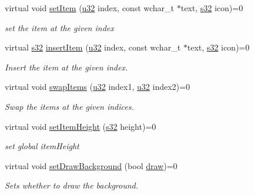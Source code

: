 \begin{DoxyCompactItemize}
\mbox{\label{classirr_1_1gui_1_1IGUIListBox_a643ca28110a7de59a378e5ba79b1c37a}} 
virtual void \hyperlink{classirr_1_1gui_1_1IGUIListBox_a643ca28110a7de59a378e5ba79b1c37a}{set\+Item} (\hyperlink{namespaceirr_a0416a53257075833e7002efd0a18e804}{u32} index, const wchar\+\_\+t $\ast$text, \hyperlink{namespaceirr_ac66849b7a6ed16e30ebede579f9b47c6}{s32} icon)=0
\begin{DoxyCompactList}\small\item\em set the item at the given index \end{DoxyCompactList}\item 
virtual \hyperlink{namespaceirr_ac66849b7a6ed16e30ebede579f9b47c6}{s32} \hyperlink{classirr_1_1gui_1_1IGUIListBox_a1da5cc33687efee5ff1e33ab9f0d5b26}{insert\+Item} (\hyperlink{namespaceirr_a0416a53257075833e7002efd0a18e804}{u32} index, const wchar\+\_\+t $\ast$text, \hyperlink{namespaceirr_ac66849b7a6ed16e30ebede579f9b47c6}{s32} icon)=0
\begin{DoxyCompactList}\small\item\em Insert the item at the given index. \end{DoxyCompactList}\item 
\mbox{\label{classirr_1_1gui_1_1IGUIListBox_accb47d6f72558ea5d3034b3e4e4ccd81}} 
virtual void \hyperlink{classirr_1_1gui_1_1IGUIListBox_accb47d6f72558ea5d3034b3e4e4ccd81}{swap\+Items} (\hyperlink{namespaceirr_a0416a53257075833e7002efd0a18e804}{u32} index1, \hyperlink{namespaceirr_a0416a53257075833e7002efd0a18e804}{u32} index2)=0
\begin{DoxyCompactList}\small\item\em Swap the items at the given indices. \end{DoxyCompactList}\item 
\mbox{\label{classirr_1_1gui_1_1IGUIListBox_a83fb9c6f32039a39197cf799dd5e0c8f}} 
virtual void \hyperlink{classirr_1_1gui_1_1IGUIListBox_a83fb9c6f32039a39197cf799dd5e0c8f}{set\+Item\+Height} (\hyperlink{namespaceirr_ac66849b7a6ed16e30ebede579f9b47c6}{s32} height)=0
\begin{DoxyCompactList}\small\item\em set global item\+Height \end{DoxyCompactList}\item 
\mbox{\label{classirr_1_1gui_1_1IGUIListBox_ad323fdf0b083dbc1870d7fa5869cff8f}} 
virtual void \hyperlink{classirr_1_1gui_1_1IGUIListBox_ad323fdf0b083dbc1870d7fa5869cff8f}{set\+Draw\+Background} (bool \hyperlink{classirr_1_1gui_1_1IGUIElement_a1ef7eeaff67b8a9f4f37cacdc7e54be2}{draw})=0
\begin{DoxyCompactList}\small\item\em Sets whether to draw the background. \end{DoxyCompactList}\end{DoxyCompactItemize}
